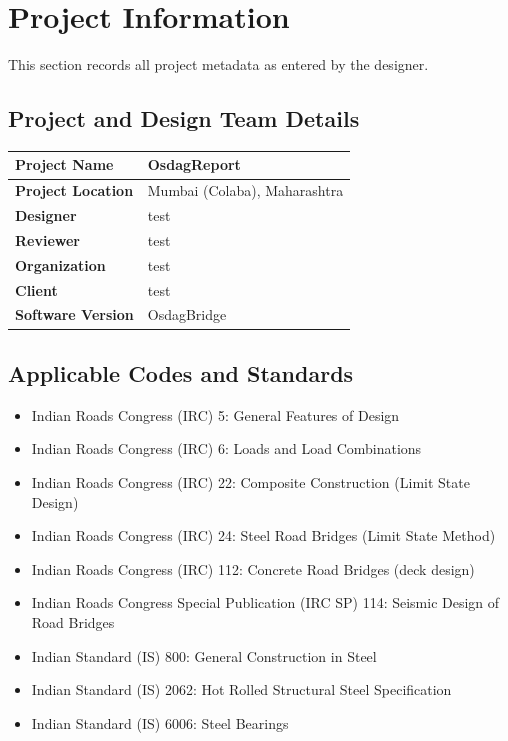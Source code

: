 \documentclass[12pt,a4paper]{report}
\numberwithin{table}{chapter}
\numberwithin{figure}{chapter}
\begin{document}
\titleformat{\chapter}[block]{\normalfont\Large\bfseries\centering}{\thechapter}{1em}{}
\titlespacing*{\chapter}{0pt}{-30pt}{10pt}


\chapter{Project Information}

This section records all project metadata as entered by the designer.

\section{Project and Design Team Details}
\label{sec:project-details}

\begin{tabular}{|L{5.5cm}|L{8.5cm}|}
\hline
\textbf{Project Name} & OsdagReport \\
\hline
\textbf{Project Location} & Mumbai (Colaba), Maharashtra \\
\hline
\textbf{Designer} & test \\
\hline
\textbf{Reviewer} & test \\
\hline
\textbf{Organization} & test \\
\hline
\textbf{Client} & test \\
\hline
\textbf{Software Version} & OsdagBridge \\
\hline
\end{tabular}


\section{Applicable Codes and Standards}
\label{sec:codes}

\begin{itemize}
\item Indian Roads Congress (IRC) 5: General Features of Design
\item Indian Roads Congress (IRC) 6: Loads and Load Combinations
\item Indian Roads Congress (IRC) 22: Composite Construction (Limit State Design)
\item Indian Roads Congress (IRC) 24: Steel Road Bridges (Limit State Method)
\item Indian Roads Congress (IRC) 112: Concrete Road Bridges (deck design)
\item Indian Roads Congress Special Publication (IRC SP) 114: Seismic Design of Road Bridges
\item Indian Standard (IS) 800: General Construction in Steel
\item Indian Standard (IS) 2062: Hot Rolled Structural Steel Specification
\item Indian Standard (IS) 6006: Steel Bearings
\end{itemize}
\end{document}
